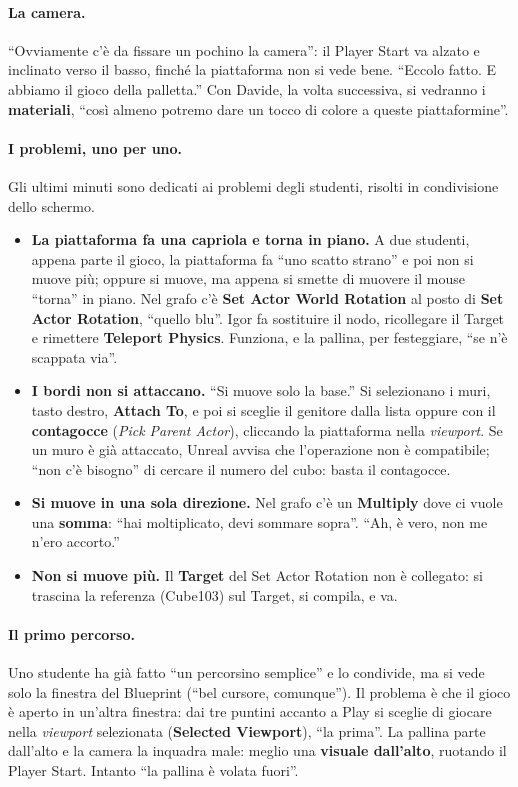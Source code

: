 \paragraph{La camera.} ``Ovviamente c'è da fissare un pochino la camera'': il Player
Start va alzato e inclinato verso il basso, finché la piattaforma non si vede bene.
``Eccolo fatto. E abbiamo il gioco della palletta.'' Con Davide, la volta successiva,
si vedranno i \textbf{materiali}, ``così almeno potremo dare un tocco di colore a queste
piattaformine''.

\paragraph{I problemi, uno per uno.} Gli ultimi minuti sono dedicati ai problemi degli
studenti, risolti in condivisione dello schermo.
\begin{itemize}
  \item \textbf{La piattaforma fa una capriola e torna in piano.} A due studenti, appena
        parte il gioco, la piattaforma fa ``uno scatto strano'' e poi non si muove più;
        oppure si muove, ma appena si smette di muovere il mouse ``torna'' in piano. Nel
        grafo c'è \textbf{Set Actor World Rotation} al posto di \textbf{Set Actor
        Rotation}, ``quello blu''. Igor fa sostituire il nodo, ricollegare il Target e
        rimettere \textbf{Teleport Physics}. Funziona, e la pallina, per festeggiare,
        ``se n'è scappata via''.
  \item \textbf{I bordi non si attaccano.} ``Si muove solo la base.'' Si selezionano i
        muri, tasto destro, \textbf{Attach To}, e poi si sceglie il genitore dalla lista
        oppure con il \textbf{contagocce} (\emph{Pick Parent Actor}), cliccando la
        piattaforma nella \emph{viewport}. Se un muro è già attaccato, Unreal avvisa che
        l'operazione non è compatibile; ``non c'è bisogno'' di cercare il numero del
        cubo: basta il contagocce.
  \item \textbf{Si muove in una sola direzione.} Nel grafo c'è un \textbf{Multiply} dove
        ci vuole una \textbf{somma}: ``hai moltiplicato, devi sommare sopra''. ``Ah, è
        vero, non me n'ero accorto.''
  \item \textbf{Non si muove più.} Il \textbf{Target} del Set Actor Rotation non è
        collegato: si trascina la referenza (Cube103) sul Target, si compila, e va.
\end{itemize}

\paragraph{Il primo percorso.} Uno studente ha già fatto ``un percorsino semplice'' e lo
condivide, ma si vede solo la finestra del Blueprint (``bel cursore, comunque''). Il
problema è che il gioco è aperto in un'altra finestra: dai tre puntini accanto a Play si
sceglie di giocare nella \emph{viewport} selezionata (\textbf{Selected Viewport}),
``la prima''. La pallina parte dall'alto e la camera la inquadra male: meglio una
\textbf{visuale dall'alto}, ruotando il Player Start. Intanto ``la pallina è volata
fuori''.

